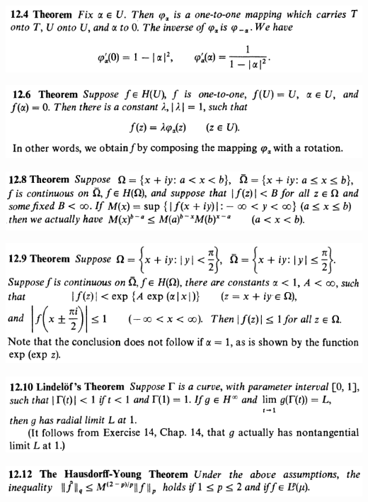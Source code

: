 \documentclass[12pt]{article}
\begin{document}
		\begin{center}
		\includegraphics{12ponto4}
		\end{center}

		\begin{center}
		\includegraphics{12ponto6}
		\end{center}

		\begin{center}
		\includegraphics{12ponto8}
		\end{center}

		\begin{center}
		\includegraphics{12ponto9}
		\end{center}

		\begin{center}
		\includegraphics{12ponto10}
		\end{center}

		\begin{center}
		\includegraphics{12ponto12}
		\end{center}
\end{document}
